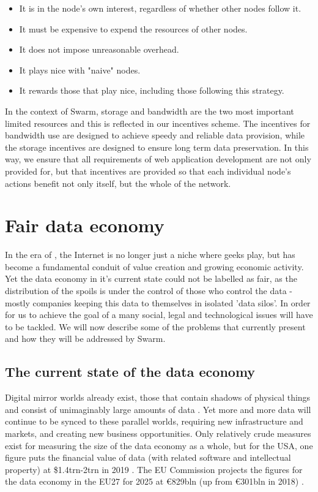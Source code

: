 \begin{itemize}
    \item It is in the node's own interest, regardless of whether other nodes follow it.
    \item It must be expensive to expend the resources of other nodes.
    \item It does not impose unreasonable overhead.
    \item It plays nice with "naive" nodes.
    \item It rewards those that play nice, including those following this strategy.
\end{itemize}

In the context of Swarm, storage and bandwidth are the two most important limited resources and this is reflected in our incentives scheme. The incentives for bandwidth use are designed to achieve speedy and reliable data provision, while the storage incentives are designed to ensure long term data preservation. In this way, we ensure that all requirements of web application development are not only provided for, but that incentives are provided so that each individual node's actions benefit not only itself, but the whole of the network. 

\section{Fair data economy  \statusgreen}\label{sec:fair-data}
\green{}

In the era of , the Internet is no longer just a niche where geeks play, but has become a fundamental conduit of value creation and growing economic activity. Yet the data economy in it's current state could not be labelled as fair, as the distribution of the spoils is under the control of those who control the data - mostly companies keeping this data to themselves in isolated 'data silos'. In order for us to achieve the goal of a  many social, legal and technological issues will have to be tackled. We will now describe some of the problems that currently present and how they will be addressed by Swarm. 

\subsection{The current state of the data economy  \statusgreen} \label{sec:dataeconomy}

Digital mirror worlds already exist, those that contain shadows of physical things and consist of unimaginably large amounts of data \cite{MirrorWorlds2020Feb}. Yet more and more data will continue to be synced to these parallel worlds, requiring new infrastructure and markets, and creating new business opportunities. Only relatively crude measures exist for measuring the size of the data economy as a whole, but for the USA, one figure puts the financial value of data (with related software and intellectual property) at \$1.4trn-2trn in 2019 \cite{MirrorWorlds2020Feb}. The EU Commission projects the figures for the data economy in the EU27 for 2025 at €829bln (up from €301bln in 2018) \cite{EUDataStrategy2020Feb}. 

